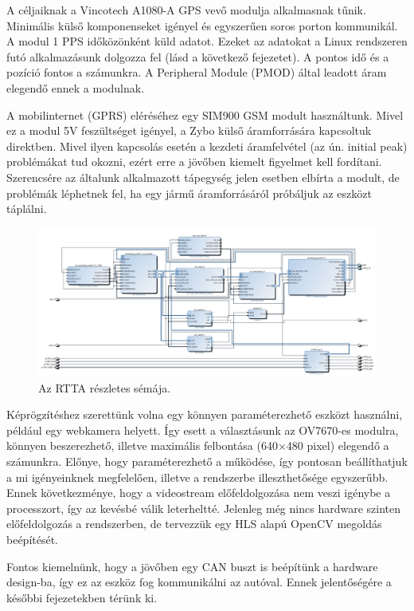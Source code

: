 \documentclass[a4paper,12pt]{report}
\begin{document}
A céljaiknak a Vincotech A1080-A GPS vevő modulja alkalmasnak tűnik. Minimális külső komponenseket igényel és egyszerűen soros porton kommunikál. A modul 1 PPS időközönként küld adatot. Ezeket az adatokat a Linux rendszeren futó alkalmazásunk dolgozza fel (lásd a következő fejezetet). A pontos idő és a pozíció fontos a számunkra. A Peripheral Module (PMOD) által leadott áram elegendő ennek a modulnak.

A mobilinternet (GPRS) eléréséhez egy SIM900 GSM modult használtunk. Mivel ez a modul 5V feszültséget igényel, a Zybo külső áramforrására kapcsoltuk direktben. Mivel ilyen kapcsolás esetén a kezdeti áramfelvétel (az ún. initial peak) problémákat tud okozni, ezért erre a jövőben kiemelt figyelmet kell fordítani. Szerencsére az általunk alkalmazott tápegység jelen esetben elbírta a modult, de problémák léphetnek fel, ha egy jármű áramforrásáról próbáljuk az eszközt táplálni.

\begin{figure}
    \centering
    \includegraphics[width=10in]{img/base_design_1}
    \caption{Az RTTA részletes sémája.}
    \label{detailedscheme}
\end{figure}

Képrögzítéshez szerettünk volna egy könnyen paraméterezhető eszközt használni, például egy webkamera helyett. Így esett a választásunk az OV7670-es modulra, könnyen beszerezhető, illetve maximális felbontása (640$\times$480 pixel) elegendő a számunkra. Előnye, hogy paraméterezhető a működése, így pontosan beállíthatjuk a mi igényeinknek megfelelően, illetve a rendszerbe illeszthetősége egyszerűbb. Ennek következménye, hogy a videostream előfeldolgozása nem veszi igénybe a processzort, így az kevésbé válik leterheltté. Jelenleg még nincs hardware szinten előfeldolgozás a rendszerben, de tervezzük egy HLS alapú OpenCV megoldás beépítését.

Fontos kiemelnünk, hogy a jövőben egy CAN buszt is beépítünk a hardware design-ba, így ez az eszköz fog kommunikálni az autóval. Ennek jelentőségére a későbbi fejezetekben térünk ki.
\end{document}
